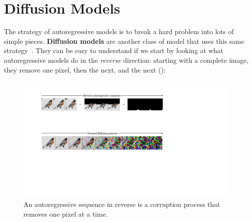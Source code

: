
\section{Diffusion Models}\label{sec:generative_models:diffusion_models}
The strategy of autoregressive models is to break a hard problem into lots of simple pieces. \textbf{Diffusion models} are another class of model that uses this same strategy~\cite{sohl2015deep}. They can be easy to understand if we start by looking at what autoregressive models do in the \textit{reverse} direction: starting with a complete image, they remove one pixel, then the next, and the next (\fig{\ref{fig:generative_models:reverse_autoregressive_sequence}}):
\begin{figure}
    \centerline{
        \includegraphics[width=1.0\linewidth]{./figures/generative_models/reverse_autoregressive_sequence.pdf}
    }
    \caption{An autoregressive sequence in reverse is a corruption process that removes one pixel at a time.}
    \label{fig:generative_models:reverse_autoregressive_sequence}
\end{figure}

